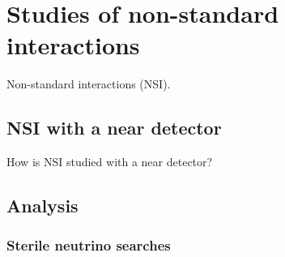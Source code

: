 \chapter{Studies of non-standard interactions}
\label{c:NSI}

Non-standard interactions (NSI).

\section{NSI with a near detector}
How is NSI studied with a near detector?

\section{Analysis}
\subsection{Sterile neutrino searches}